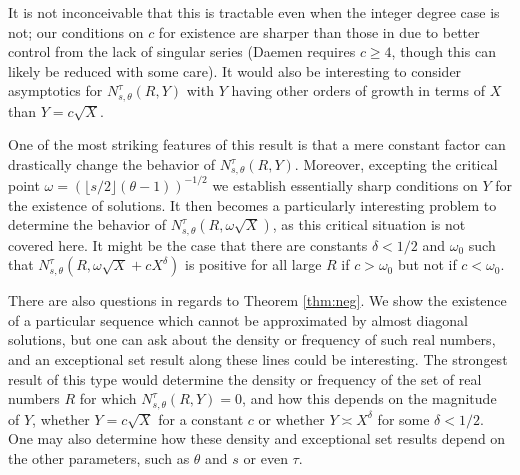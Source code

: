 \documentclass[11pt,reqno]{amsart}
\numberwithin{equation}{section}
\begin{document}
It is not inconceivable that this is tractable even when the integer degree case is not; our conditions on $c$ for existence are sharper than those in \cite{DaemenAA1} due to better control from the lack of singular series (Daemen \cite{DaemenAA1} requires $c \geq 4$, though this can likely be reduced with some care). 
It would also be interesting to consider asymptotics for $N_{s,\theta}^{\tau}(R,Y)$ with $Y$ having other orders of growth in terms of $X$ than $Y = c\sqrt{X}$. 

One of the most striking features of this result is that a mere constant factor can drastically change the behavior of $N_{s,\theta}^{\tau}(R,Y)$. Moreover, excepting the critical point $\omega = (\lfloor s/2 \rfloor(\theta-1))^{-1/2}$ we establish essentially sharp conditions on $Y$ for the existence of solutions. It then becomes a particularly interesting problem to determine the behavior of $N_{s,\theta}^{\tau}(R,\omega \sqrt{X})$, as this critical situation is not covered here. It might be the case that there are constants $\delta < 1/2$ and $\omega_0$ such that $N_{s,\theta}^{\tau}(R,\omega\sqrt{X}+cX^{\delta})$ is positive for all large $R$ if $c > \omega_0$ but not if $c < \omega_0$. 



There are also questions in regards to Theorem \ref{thm:neg}. We show the existence of a particular sequence which cannot be approximated by almost diagonal solutions, but one can ask about the density or frequency of such real numbers, and an exceptional set result along these lines could be interesting. The strongest result of this type would determine the density or frequency of the set of real numbers $R$ for which $N_{s,\theta}^{\tau}(R,Y) = 0$, and how this depends on the magnitude of $Y$, whether $Y = c\sqrt{X}$ for a constant $c$ or whether $Y \asymp X^{\delta}$ for some $\delta < 1/2$. One may also determine how these density and exceptional set results depend on the other parameters, such as $\theta$ and $s$ or even $\tau$. 
\end{document}
